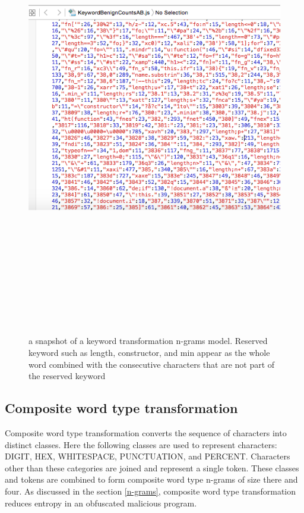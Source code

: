 \begin{figure}[htb]
\centering
\includegraphics[width=16cm,height=20cm,keepaspectratio]{image/keyword.png}
\caption[a snapshot of a keyword transformation n-grams model]{a snapshot of a keyword transformation n-grams model. Reserved keyword such as length, constructor, and min appear as the whole word combined with the consecutive characters that are not part of the reserved keyword} 
\label{fig:keyword}
\end{figure}

\subsection{Composite word type transformation}
Composite word type transformation converts the sequence of characters into distinct classes. Here the following classes are used to represent characters: DIGIT, HEX, WHITESPACE, PUNCTUATION, and PERCENT. Characters other than these categories are joined and represent a single token. These classes and tokens are combined to form composite word type n-grams of size there and four. As discussed in the section \ref{n-grams}, composite word type transformation reduces entropy in an obfuscated malicious program.

